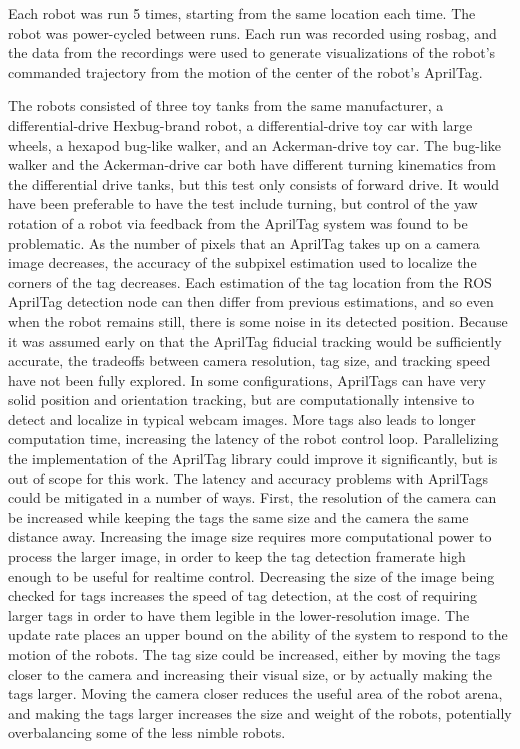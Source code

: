 Each robot was run 5 times, starting from the same location each time. The robot was power-cycled between runs. Each run was recorded using rosbag, and the data from the recordings were used to generate visualizations of the robot's commanded trajectory from the motion of the center of the robot's AprilTag.

The robots consisted of three toy tanks from the same manufacturer, a differential-drive Hexbug-brand robot, a differential-drive toy car with large wheels, a hexapod bug-like walker, and an Ackerman-drive toy car. 
The bug-like walker and the Ackerman-drive car both have different turning kinematics from the differential drive tanks, but this test only consists of forward drive.
It would have been preferable to have the test include turning, but control of the yaw rotation of a robot via feedback from the AprilTag system was found to be problematic. 
As the number of pixels that an AprilTag takes up on a camera image decreases, the accuracy of the subpixel estimation used to localize the corners of the tag decreases. 
Each estimation of the tag location from the ROS AprilTag detection node can then differ from previous estimations, and so even when the robot remains still, there is some noise in its detected position. 
Because it was assumed early on that the AprilTag fiducial tracking would be sufficiently accurate, the tradeoffs between camera resolution, tag size, and tracking speed have not been fully explored. 
In some configurations, AprilTags can have very solid position and orientation tracking, but are computationally intensive to detect and localize in typical webcam images. 
More tags also leads to longer computation time, increasing the latency of the robot control loop. 
Parallelizing the implementation of the AprilTag library could improve it significantly, but is out of scope for this work. 
The latency and accuracy problems with AprilTags could be mitigated in a number of ways. 
First, the resolution of the camera can be increased while keeping the tags the same size and the camera the same distance away. Increasing the image size requires more computational power to process the larger image, in order to keep the tag detection framerate high enough to be useful for realtime control. 
Decreasing the size of the image being checked for tags increases the speed of tag detection, at the cost of requiring larger tags in order to have them legible in the lower-resolution image. 
The update rate places an upper bound on the ability of the system to respond to the motion of the robots.
The tag size could be increased, either by moving the tags closer to the camera and increasing their visual size, or by actually making the tags larger. 
Moving the camera closer reduces the useful area of the robot arena, and making the tags larger increases the size and weight of the robots, potentially overbalancing some of the less nimble robots. 

